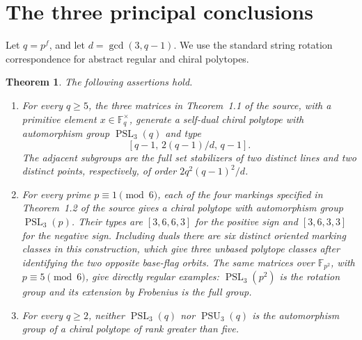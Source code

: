 \documentclass[11pt]{article}
\newtheorem{theorem}{Theorem}
\newcommand{\F}{\mathbb F}\newcommand{\PSL}{\operatorname{PSL}}\newcommand{\PSU}{\operatorname{PSU}}
\begin{document}
\section*{The three principal conclusions}
Let $q=p^f$, and let $d=\gcd(3,q-1)$. We use the standard string
rotation correspondence for abstract regular and chiral polytopes.
\begin{theorem}\label{principal}
The following assertions hold.
\begin{enumerate}
\item For every $q\ge5$, the three matrices in Theorem~1.1 of the source,
with a primitive element $x\in\F_q^\times$, generate a self-dual chiral
polytope with automorphism group $\PSL_3(q)$ and type
\[
                   [q-1,\,2(q-1)/d,\,q-1].
\]
The adjacent subgroups are the full set stabilizers of two distinct
lines and two distinct points, respectively, of order
$2q^2(q-1)^2/d$.
\item For every prime $p\equiv1\pmod6$, each of the four markings
specified in Theorem~1.2 of the source gives a chiral polytope with
automorphism group $\PSL_3(p)$. Their types are $[3,6,6,3]$ for the
positive sign and $[3,6,3,3]$ for the negative sign. Including duals
there are six distinct oriented marking classes in this construction,
which give three unbased polytope classes after identifying the two
opposite base-flag orbits. The same matrices over $\F_{p^2}$, with
$p\equiv5\pmod6$, give directly regular examples: $\PSL_3(p^2)$ is
the rotation group and its extension by Frobenius is the full group.
\item For every $q\ge2$, neither $\PSL_3(q)$ nor $\PSU_3(q)$ is the
automorphism group of a chiral polytope of rank greater than five.
\end{enumerate}
\end{theorem}
\end{document}
